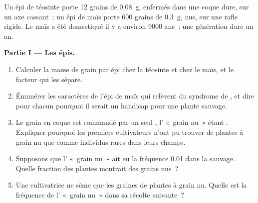 \begin{problem}
\label{pb:g12:domesticated-plants:1}
Un épi de téosinte porte 12 grains de \qty{0.08}{g}, enfermés dans une
coque dure, sur un axe cassant~; un épi de maïs porte 600 grains de
\qty{0.3}{g}, nus, sur une rafle rigide. Le maïs a été domestiqué il y
a environ 9000 ans~; une génération dure un an.

\medskip
\noindent\textbf{Partie I --- Les épis.}
\begin{enumerate}
  \item Calculer la masse de grain par épi chez la téosinte et chez le
        maïs, et le facteur qui les sépare.
  \item Énumérer les caractères de l'épi de maïs qui relèvent du
        syndrome de , et dire pour chacun pourquoi il
        serait un handicap pour une plante sauvage.
  \item Le grain en coque est commandé par un seul , l'
        «~grain nu~» étant . Expliquer pourquoi les premiers
        cultivateurs n'ont pu trouver de plantes à grain nu que comme
        individus rares dans leurs champs.
  \item Supposons que l' «~grain nu~» ait eu la fréquence 0.01
        dans la  sauvage. Quelle fraction des plantes
        montrait des grains nus~?
  \item Une cultivatrice ne sème que les graines de plantes à grain
        nu. Quelle est la fréquence de l' «~grain nu~» dans sa
        récolte suivante~?
\end{enumerate}


\end{problem}
